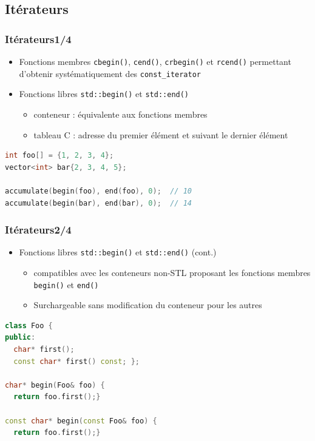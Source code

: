 \documentclass[C++.tex]{subfiles}
\begin{document}
\subsection*{Itérateurs}
\begin{frame}[fragile]
	\frametitle{Itérateurs\titlehfill{}1/4}
	\begin{itemize}
		\item Fonctions membres \lstinline|cbegin()|, \lstinline|cend()|, \lstinline|crbegin()| et \lstinline|rcend()| permettant d'obtenir systématiquement des \lstinline|const_iterator|


		\item Fonctions libres \lstinline|std::begin()| et \lstinline|std::end()|
		\begin{itemize}
			\item conteneur : équivalente aux fonctions membres
			\item tableau C : adresse du premier élément et suivant le dernier élément
		\end{itemize}
	\end{itemize}

	\begin{lstlisting}[language=C++]
int foo[] = {1, 2, 3, 4};
vector<int> bar{2, 3, 4, 5};

accumulate(begin(foo), end(foo), 0);  // 10
accumulate(begin(bar), end(bar), 0);  // 14\end{lstlisting}
\end{frame}

\begin{frame}[fragile]
	\frametitle{Itérateurs\titlehfill{}2/4}
	\begin{itemize}
		\item Fonctions libres \lstinline|std::begin()| et \lstinline|std::end()| (cont.)
		\begin{itemize}
			\item compatibles avec les conteneurs non-STL proposant les fonctions membres \lstinline|begin()| et \lstinline|end()|
			\item Surchargeable sans modification du conteneur pour les autres

		\end{itemize}
	\end{itemize}

	\begin{lstlisting}[language=C++]
class Foo {
public:
  char* first();
  const char* first() const; };

char* begin(Foo& foo) {
  return foo.first();}

const char* begin(const Foo& foo) {
  return foo.first();}\end{lstlisting}
\end{frame}
\end{document}
